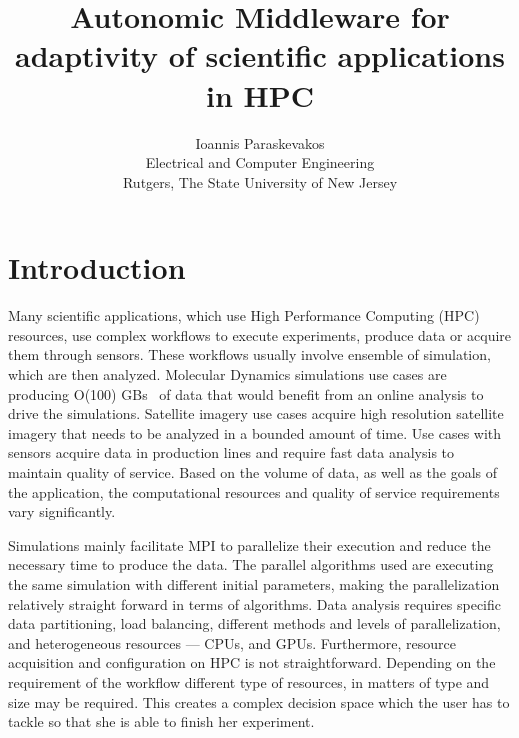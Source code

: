 

\title{Autonomic Middleware for adaptivity of  scientific applications in HPC}
\author{Ioannis Paraskevakos \\	Electrical and Computer Engineering \\Rutgers, The State University of New Jersey}


\maketitle

\abstract{}


\section{Introduction}
Many scientific applications, which use High Performance Computing (HPC) 
resources, use complex workflows to execute experiments, produce data or 
acquire them through sensors. These workflows usually involve ensemble of 
simulation, which are then analyzed. Molecular Dynamics simulations 
use cases are producing O(100) GBs~\cite{cheatham2015impact} of data that would 
benefit from an online analysis to drive the simulations. Satellite imagery use 
cases acquire high resolution satellite imagery that needs to be analyzed in a 
bounded amount of time. Use cases with sensors acquire data in production lines 
and require fast data analysis to maintain quality of service. Based on the 
volume of data, as well as the goals of the application, the computational 
resources and quality of service requirements vary significantly. 


Simulations mainly facilitate MPI to parallelize their execution and reduce the 
necessary time to produce the data. The parallel algorithms used are executing 
the same simulation with different initial parameters, making the 
parallelization relatively straight forward in terms of algorithms. Data 
analysis requires specific data partitioning, load balancing, different methods 
and levels of parallelization, and heterogeneous resources --- CPUs, and GPUs. 
Furthermore, resource acquisition and configuration on HPC is not 
straightforward. Depending on the requirement of the workflow different type of 
resources, in matters of type and size may be required. This creates a complex 
decision space which the user has to tackle so that she is able to finish her 
experiment.

